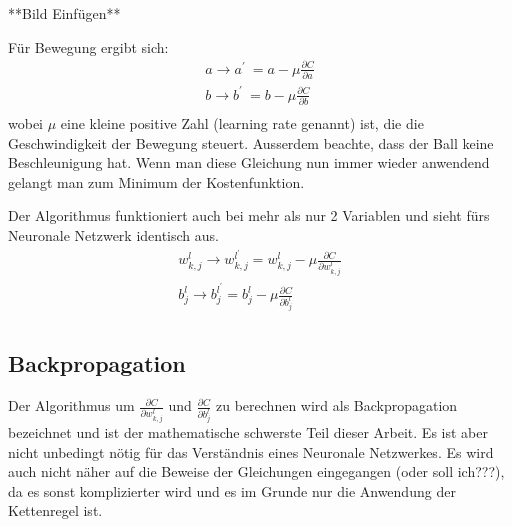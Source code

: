 \documentclass[12pt,a4paper]{report}
\begin{document}
**Bild Einfügen**

Für Bewegung ergibt sich:
\begin{gather*}
    a \rightarrow a^\prime\ = a - \mu\frac{\partial C}{\partial a}\\
    b \rightarrow b^\prime\ = b - \mu\frac{\partial C}{\partial b}\\
\end{gather*}
wobei $\mu$ eine kleine positive Zahl (learning rate genannt) ist, die die Geschwindigkeit der Bewegung steuert.
Ausserdem beachte, dass der Ball keine Beschleunigung hat.
Wenn man diese Gleichung nun immer wieder anwendend gelangt man zum Minimum der Kostenfunktion.

Der Algorithmus funktioniert auch bei mehr als nur 2 Variablen und sieht fürs Neuronale Netzwerk identisch aus.
\begin{gather*}
    w^l_{k,j} \rightarrow w^{l^\prime}_{k,j} = w^l_{k,j} - \mu\frac{\partial C}{\partial w^l_{k,j}}\\
    b^l_j \rightarrow b^{l^\prime}_j = b^l_j - \mu\frac{\partial C}{\partial b^l_j}\\
\end{gather*}

\subsection{Backpropagation}
Der Algorithmus um $\frac{\partial C}{\partial w^l_{k,j}}$ und $\frac{\partial C}{\partial b^l_j}$ zu berechnen wird als
Backpropagation bezeichnet und ist der mathematische schwerste Teil dieser Arbeit.
Es ist aber nicht unbedingt nötig für das Verständnis eines Neuronale Netzwerkes.
Es wird auch nicht näher auf die Beweise der Gleichungen eingegangen (oder soll ich???),
da es sonst komplizierter wird und es im Grunde nur die Anwendung der Kettenregel ist.
\end{document}
